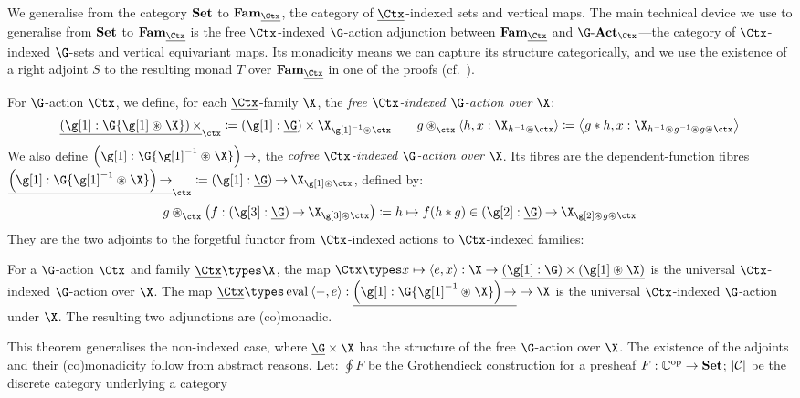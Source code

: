We generalise from the category ${\mathbf{ Set}}$ to $\Fam_{\carrier\Ctx}$, the
category of $\carrier\Ctx$-indexed sets and vertical maps.  The main
technical device we use to generalise from ${\mathbf{ Set}}$ to
$\Fam_{\carrier\Ctx}$ is the free $\Ctx$-indexed $\G$-action
adjunction between $\Fam_{\carrier\Ctx}$ and $\Action\G_{\Ctx}$---the
category of $\Ctx$-indexed $\G$-sets and vertical equivariant maps.
Its monadicity means we can capture its structure categorically, and
we use the existence of a right adjoint $S$ to the resulting monad $T$
over $\Fam_{\carrier\Ctx}$ in one of the proofs (cf.~).

For $\G$-action $\Ctx$, we define, for each
$\carrier\Ctx$-family $\X$, the \emph{free $\Ctx$-indexed $\G$-action over} $\X$:
\begin{gather*}
\carrier{\DPair{\mg}\G{\mg\act\X}}_{\ctx} \definedby
\DPair{\mg}{\carrier\G}{\X_{\inv \mg \act \ctx}}
\qquad
g\iact{\ctx}\pair{h}{x : \X_{\inv h\act \ctx}} \definedby
\pair{g\mul h}{x : \X_{\inv h \act \inv g \act g \act \ctx}}
\end{gather*}
We also define $\DFun{\mg}\G{\inv\mg\act\X}$,
the \emph{cofree $\Ctx$-indexed $\G$-action over} $\X$.
Its fibres are the dependent-function fibres
\(
\carrier{\DFun{\mg}\G{\inv\mg\act\X}}_{\ctx} \definedby
\DFun{\mg}{\carrier\G}{\X_{\mg \act \ctx}}
\), defined by:
\[
g\iact{\ctx}\parent{f : \DFun{\g[3]}{\carrier\G}\X_{\g[3]\act\ctx}}
\definedby\fun h f(h\mul g) \in \DFun{\mg[2]}{\carrier\G}\X_{\mg[2]\act g\act\ctx}
\]
They are the two adjoints to
the forgetful functor from $\Ctx$-indexed actions to $\Ctx$-indexed families:
\begin{theorem}
  For a $\G$-action $\Ctx$ and family $\carrier\Ctx \types \X$, the
  map $\Ctx \types \fun x\pair\unit x : \X \to
  \carrier{\DPair\mg\G(\mg\act\X)}$ is the universal $\Ctx$-indexed
  $\G$-action over $\X$.  The map
  $\carrier\Ctx\types\eval\pair{-}\unit :
  \carrier{\DFun\mg\G{\inv\mg\act\X}} \to \X$ is the universal
  $\Ctx$-indexed $\G$-action under $\X$. The resulting two adjunctions
  are (co)monadic.
\end{theorem}
This theorem generalises the non-indexed case, where
$\carrier\G\times\X$ has the structure of the free $\G$-action over
$\X$.  The existence of the adjoints and their (co)monadicity follow
from abstract reasons. Let: $\oint F$ be the Grothendieck
construction for a presheaf $F : {\mathbb C}^{\rm op} \to {\mathbf{ Set}}$;
$\left\lvert\mathcal C\right\rvert$ be the discrete category underlying a category
